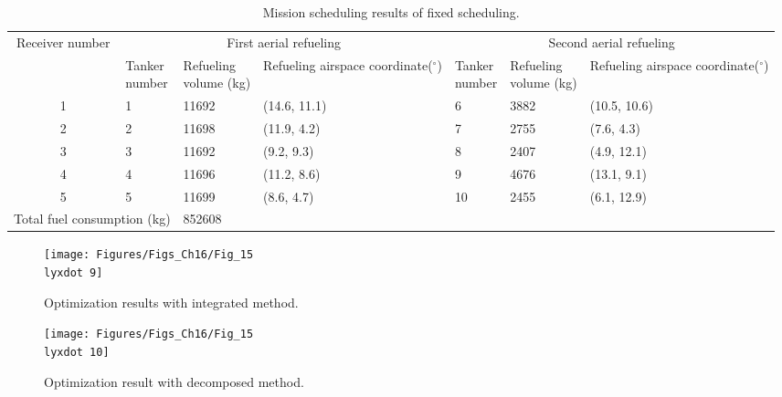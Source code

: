 \begin{table}
	\caption{Mission scheduling results of fixed scheduling.}
	\begin{centering}
		\begin{tabular}{c|l|l|l|l|l|l}
			\hline
			\multirow{2}{*}{Receiver number}& \multicolumn{3}{c|}{First aerial refueling} & \multicolumn{3}{c}{Second aerial refueling} \\\cline{2-7}
			& \tabincell{l}{Tanker\\number}& \tabincell{l}{Refueling\\volume (kg)}&\tabincell{l}{Refueling airspace \\coordinate($^{\circ}$)}&\tabincell{l}{Tanker\\number}&\tabincell{l}{Refueling\\volume (kg)}&\tabincell{l}{Refueling airspace \\coordinate($^{\circ}$)} \\
			\hline
			1 & 1& 11692& (14.6, 11.1)&6&3882&(10.5, 10.6) \\
			2 & 2& 11698& (11.9, 4.2)&7&2755&(7.6, 4.3) \\
			3 & 3& 11692& (9.2, 9.3)&8&2407&(4.9, 12.1) \\
			4 & 4& 11696& (11.2, 8.6)&9&4676&(13.1, 9.1) \\
			5 & 5& 11699& (8.6, 4.7)&10&2455&(6.1, 12.9) \\\hline
			\multicolumn{2}{l}{Total fuel consumption (kg)}& \multicolumn{5}{l}{852608}\\
			\hline 
		\end{tabular}
		\par\end{centering}
	\centering{}
	\label{Tab_15.5}
\end{table}







\begin{figure}
	\begin{centering}
		\texttt{[image: Figures/Figs\_Ch16/Fig\_15\\lyxdot 9]}
		\par\end{centering}
	\caption{Optimization results with integrated method.}
	\centering{}\label{Fig_15.9}
\end{figure}

\begin{figure}
	\begin{centering}
		\texttt{[image: Figures/Figs\_Ch16/Fig\_15\\lyxdot 10]}
		\par\end{centering}
	\caption{Optimization result with decomposed method.}
	\centering{}\label{Fig_15.10}
\end{figure}
